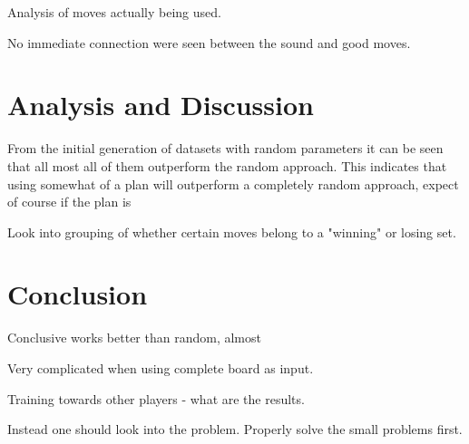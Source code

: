 \documentclass{llncs}
\begin{document}
Analysis of moves actually being used.


No immediate connection were seen between the sound and good moves.



\section*{Analysis and Discussion} %

From the initial generation of datasets with random parameters it can be seen that all most all of them outperform the random approach. This indicates that using somewhat of a plan will outperform a completely random approach, expect of course if the plan is 


Look into grouping of whether certain moves belong to a "winning" or losing set.



\section*{Conclusion} %

Conclusive  works better than random, almost 

Very complicated when using complete board as input.

Training towards other players - what are the results.


Instead one should look into the problem. Properly solve the small problems first.  
\end{document}
